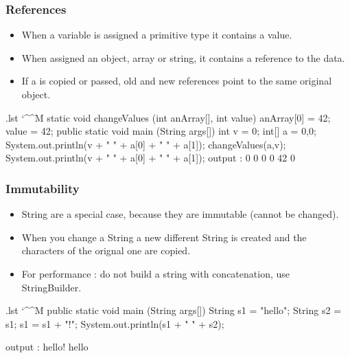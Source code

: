 \documentclass[10pt, handout]{beamer}
\makeatletter
\newenvironment{code}{%
  \begingroup
  \@bsphack
  \immediate\openout\lstvrb@out\jobname.lst
  \let\do\@makeother\dospecials\catcode`\^^M\active
  \def\verbatim@processline{%
    \immediate\write\lstvrb@out{\the\verbatim@line}}%
  \verbatim@start}{%
  \immediate\closeout\lstvrb@out
  \@esphack
  \endgroup
  
  \begin{alertblock}{}
    
  \end{alertblock}}
\makeatother
\begin{document}
\begin{frame}
  \frametitle{References}
  \begin{itemize}
    \item When a variable is assigned a primitive type it contains a value.
    \item When assigned an object, array or string, it contains a reference to the data.
    \item If a is copied or passed, old and new references point to the \alert{same original object}.
  \end{itemize}

  \begin{code}
static void changeValues (int anArray[], int value){
  anArray[0] = 42;
  value = 42;
}
public static void main (String args[]){
  int v = 0; int[] a = {0,0};
  System.out.println(v + " " + a[0] + " " + a[1]);
  changeValues(a,v);
  System.out.println(v + " " + a[0] + " " + a[1]);
} 
output : 
0 0 0
0 42 0
  \end{code}
\end{frame}

\begin{frame}[fragile]
  \frametitle{Immutability}
  \begin{itemize}
    \item String are a special case, because they are immutable (cannot be changed).
    \item When you change a String a new different String is created and the characters of the orignal one are copied.
    \item For performance : do not build a string with concatenation, use StringBuilder.
  \end{itemize}
  \begin{code}
public static void main (String args[]) {
  String s1 = "hello";
  String s2 = s1;
  s1 = s1 + "!";
  System.out.println(s1 + " " + s2);
}

output : 
hello! hello
  \end{code}
\end{frame}
\end{document}
